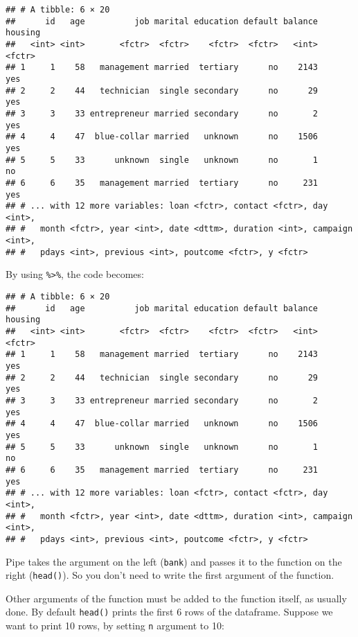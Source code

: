 \documentclass[]{book}
\newenvironment{Shaded}{\begin{snugshade}}{\end{snugshade}}
\newcommand{\KeywordTok}[1]{\textcolor[rgb]{0.13,0.29,0.53}{\textbf{{#1}}}}
\newcommand{\StringTok}[1]{\textcolor[rgb]{0.31,0.60,0.02}{{#1}}}
\newcommand{\NormalTok}[1]{{#1}}
\begin{document}
\begin{verbatim}
## # A tibble: 6 × 20
##      id   age          job marital education default balance housing
##   <int> <int>       <fctr>  <fctr>    <fctr>  <fctr>   <int>  <fctr>
## 1     1    58   management married  tertiary      no    2143     yes
## 2     2    44   technician  single secondary      no      29     yes
## 3     3    33 entrepreneur married secondary      no       2     yes
## 4     4    47  blue-collar married   unknown      no    1506     yes
## 5     5    33      unknown  single   unknown      no       1      no
## 6     6    35   management married  tertiary      no     231     yes
## # ... with 12 more variables: loan <fctr>, contact <fctr>, day <int>,
## #   month <fctr>, year <int>, date <dttm>, duration <int>, campaign <int>,
## #   pdays <int>, previous <int>, poutcome <fctr>, y <fctr>
\end{verbatim}

By using \texttt{\%\textgreater{}\%}, the code becomes:

\begin{Shaded}
\end{Shaded}

\begin{verbatim}
## # A tibble: 6 × 20
##      id   age          job marital education default balance housing
##   <int> <int>       <fctr>  <fctr>    <fctr>  <fctr>   <int>  <fctr>
## 1     1    58   management married  tertiary      no    2143     yes
## 2     2    44   technician  single secondary      no      29     yes
## 3     3    33 entrepreneur married secondary      no       2     yes
## 4     4    47  blue-collar married   unknown      no    1506     yes
## 5     5    33      unknown  single   unknown      no       1      no
## 6     6    35   management married  tertiary      no     231     yes
## # ... with 12 more variables: loan <fctr>, contact <fctr>, day <int>,
## #   month <fctr>, year <int>, date <dttm>, duration <int>, campaign <int>,
## #   pdays <int>, previous <int>, poutcome <fctr>, y <fctr>
\end{verbatim}

Pipe takes the argument on the left (\texttt{bank}) and passes it to the
function on the right (\texttt{head()}). So you don't need to write the
first argument of the function.

Other arguments of the function must be added to the function itself, as
usually done. By default \texttt{head()} prints the first 6 rows of the
dataframe. Suppose we want to print 10 rows, by setting \texttt{n}
argument to 10:
\end{document}
